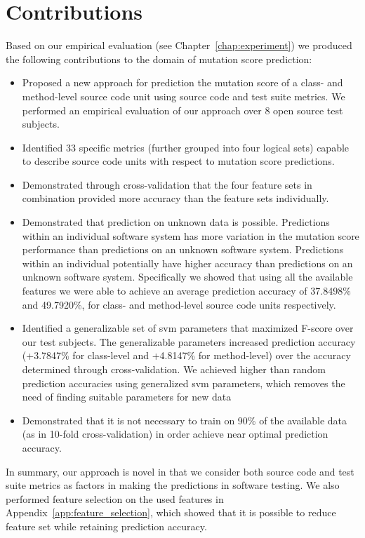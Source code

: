 \section{Contributions}
\label{sec:conclusions_contributions}
Based on our empirical evaluation (see Chapter~\ref{chap:experiment}) we produced the following contributions to the domain of mutation score prediction:

\begin{itemize}
  \item Proposed a new approach for prediction the mutation score of a class- and method-level source code unit using source code and test suite metrics. We performed an empirical evaluation of our approach over 8 open source test subjects.
  \item Identified 33 specific metrics (further grouped into four logical sets) capable to describe source code units with respect to mutation score predictions.
  \item Demonstrated through cross-validation that the four feature sets in combination provided more accuracy than the feature sets individually.
  \item Demonstrated that prediction on unknown data is possible. Predictions within an individual software system has more variation in the mutation score performance than predictions on an unknown software system. Predictions within an individual potentially have higher accuracy than predictions on an unknown software system. Specifically we showed that using all the available features we were able to achieve an average prediction accuracy of 37.8498\% and 49.7920\%, for class- and method-level source code units respectively.
  \item Identified a generalizable set of \gls{svm} parameters that maximized F-score over our test subjects. The generalizable parameters increased prediction accuracy (+3.7847\% for class-level and +4.8147\% for method-level) over the accuracy determined through cross-validation. We achieved higher than random prediction accuracies using generalized \gls{svm} parameters, which removes the need of finding suitable parameters for new data
  \item Demonstrated that it is not necessary to train on 90\% of the available data (as in 10-fold cross-validation) in order achieve near optimal prediction accuracy.
\end{itemize}

In summary, our approach is novel in that we consider both source code and test suite metrics as factors in making the predictions in software testing. We also performed feature selection on the used features in Appendix~\ref{app:feature_selection}, which showed that it is possible to reduce feature set while retaining prediction accuracy.


